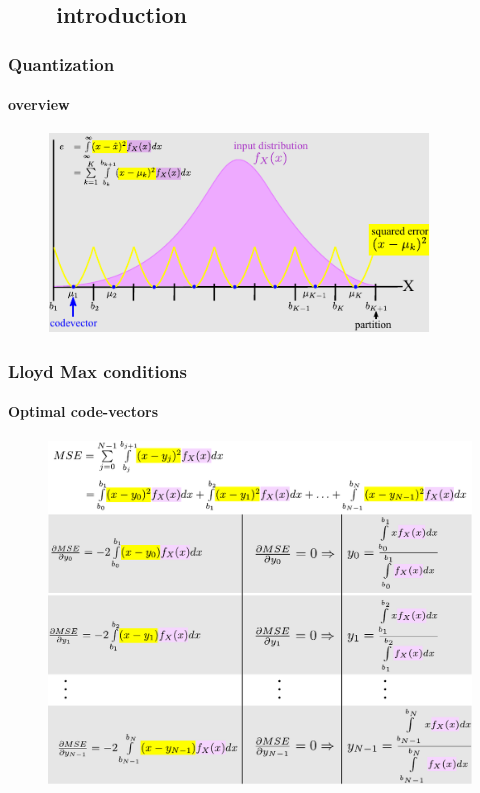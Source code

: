 \subsection{\ \ \ \ introduction}

\begin{frame}
\frametitle{Quantization}
\framesubtitle{overview}
\logoCSIPCPL\mypagenum
	\begin{figure}				
		\includegraphics[width=0.9\textwidth]{thesis/Quantization_MSE.pdf}
	\end{figure}
\end{frame}





\begin{frame}[plain]
\frametitle{Lloyd Max conditions}
\framesubtitle{Optimal code-vectors}
\logoCSIPCPL\mypagenum
	\begin{changemargin}{-1.3in}{0in}
		\begin{figure}				
			\includegraphics[height=0.8\textheight]{thesis/Quantization_optimalCodevectors.pdf}
		\end{figure}
	\end{changemargin}
\end{frame}




